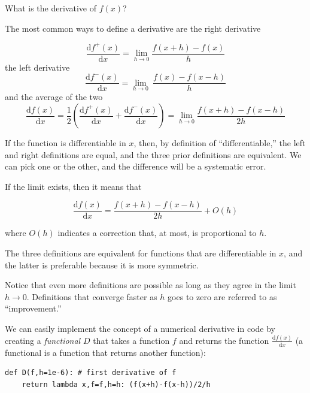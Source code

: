 \documentclass[justified,sixbynine]{tufte-book}
\def\ft{\small\tt}
\theoremstyle{plain}%
\theoremstyle{definition}
\theoremstyle{remark}
\begin{document}
\begin{fullwidth}
What is the derivative of $f(x)$?

The most common ways to define a derivative are the right derivative

\begin{equation}
  \frac{\textrm{d}f^{+}(x)}{\textrm{d}x} = \lim_{h\rightarrow 0}
  \frac{f(x+h)-f(x)}{h}
\end{equation}
the left derivative
\begin{equation}
  \frac{\textrm{d}f^{-}(x)}{\textrm{d}x} = \lim_{h\rightarrow 0}\
  \frac{f(x)-f(x-h)}{h}
\end{equation}
and the average of the two
\begin{equation}
  \frac{\textrm{d}f(x)}{\textrm{d}x} = \frac12\left(
  \frac{\textrm{d}f^{+}(x)}{\textrm{d}x} +
  \frac{\textrm{d}f^{-}(x)}{\textrm{d}x} \right) =
  \lim_{h\rightarrow 0}\frac{f(x+h)-f(x-h)}{2h}
\end{equation}

If the function is differentiable in $x$, then, by definition of ``differentiable,'' the left and right definitions are equal, and the three prior definitions are equivalent. We can pick one or the other, and the difference will be a systematic error.

If the limit exists, then it means that

\begin{equation}
\frac{\textrm{d}f(x)}{\textrm{d}x} = \frac{f(x+h)-f(x-h)}{2h} + O(h)
\end{equation}

where $O(h)$ indicates a correction that, at most, is proportional to $h$.

The three definitions are equivalent for functions that are differentiable in $x$, and the latter is preferable because it is more symmetric.

Notice that even more definitions are possible as long as they agree in the limit $h\rightarrow 0$. Definitions that converge faster as $h$ goes to zero are referred to as ``improvement.''



We can easily implement the concept of a numerical derivative in code by creating a {\it functional} $D$ that takes a function $f$ and returns the function $\frac{\textrm{d}f(x)}{\textrm{d}x}$ (a functional is a function that returns another function):

\begin{lstlisting}[caption={in file: {\ft nlib.py}}]
def D(f,h=1e-6): # first derivative of f
    return lambda x,f=f,h=h: (f(x+h)-f(x-h))/2/h
\end{lstlisting}


\end{fullwidth}
\end{document}
